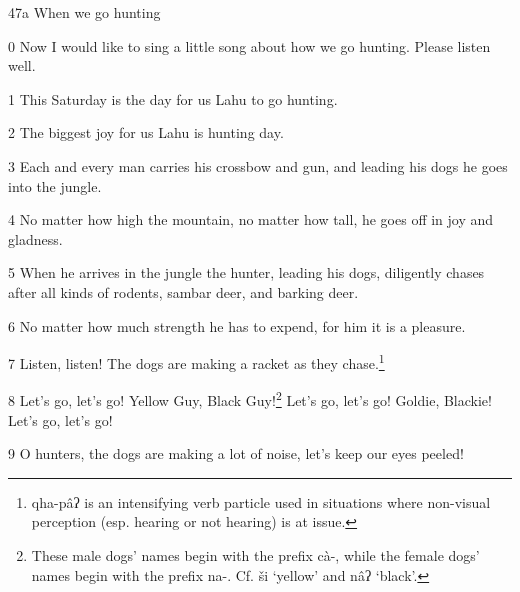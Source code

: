 
47a When we go hunting

0 Now I would like to sing a little song about how we go hunting. Please listen
well.

1 This Saturday is the day for us Lahu to go hunting.

2 The biggest joy for us Lahu is hunting day.

3 Each and every man carries his crossbow and gun, and leading his dogs he goes
into the jungle.

4 No matter how high the mountain, no matter how tall, he goes off in joy and gladness.

5 When he arrives in the jungle the hunter, leading his dogs, diligently chases
after all kinds of rodents, sambar deer, and barking deer.

6 No matter how much strength he has to expend, for him it is a pleasure.

7 Listen, listen! The dogs are making a racket as they chase.\footnote{qha-pâʔ is an intensifying verb particle used in situations where non-visual perception (esp. hearing or not hearing) is at issue.}

8 Let's go, let's go! Yellow Guy, Black Guy!\footnote{These male dogs' names begin with the prefix cà-, while the female dogs' names begin with the prefix na-. Cf. ši `yellow' and nâʔ `black'.} Let's go, let's go! Goldie, Blackie!
Let's go, let's go!

9 O hunters, the dogs are making a lot of noise, let's keep our eyes peeled!

